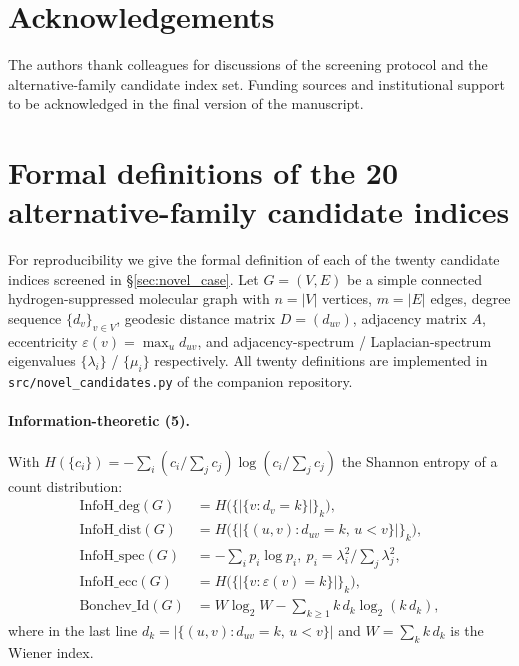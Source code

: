 \documentclass[STIX1COL]{WileyNJDv5}
\theoremstyle{definition}
\begin{document}
\section*{Acknowledgements}

The authors thank colleagues for discussions of the screening
protocol and the alternative-family candidate index set. Funding
sources and institutional support to be acknowledged in the final
version of the manuscript.

\appendix
\section{Formal definitions of the 20 alternative-family candidate indices}\label{app:candidates}

For reproducibility we give the formal definition of each of the
twenty candidate indices screened in \S\ref{sec:novel_case}. Let
$G = (V, E)$ be a simple connected hydrogen-suppressed molecular
graph with $n = |V|$ vertices, $m = |E|$ edges, degree sequence
$\{d_v\}_{v\in V}$, geodesic distance matrix $D = (d_{uv})$,
adjacency matrix $A$, eccentricity $\varepsilon(v) = \max_u d_{uv}$,
and adjacency-spectrum / Laplacian-spectrum eigenvalues
$\{\lambda_i\}$ / $\{\mu_i\}$ respectively. All twenty definitions
are implemented in
\texttt{src/novel\_candidates.py} of the companion repository.

\paragraph{Information-theoretic (5).}
With $H(\{c_i\}) = -\sum_i (c_i / \sum_j c_j)\log(c_i / \sum_j c_j)$
the Shannon entropy of a count distribution:
\begin{align*}
\mathrm{InfoH\_deg}(G) &= H\bigl(\{|\{v : d_v = k\}|\}_k\bigr), \\
\mathrm{InfoH\_dist}(G) &= H\bigl(\{|\{(u,v) : d_{uv} = k,\, u<v\}|\}_k\bigr), \\
\mathrm{InfoH\_spec}(G) &= -\sum_{i} p_i \log p_i,\ p_i = \lambda_i^2 / \textstyle\sum_j \lambda_j^2, \\
\mathrm{InfoH\_ecc}(G) &= H\bigl(\{|\{v : \varepsilon(v) = k\}|\}_k\bigr), \\
\mathrm{Bonchev\_Id}(G) &= W\log_2 W - \sum_{k \ge 1} k\,d_k \log_2(k\,d_k),
\end{align*}
where in the last line $d_k = |\{(u,v) : d_{uv}=k,\,u<v\}|$ and
$W = \sum_k k\,d_k$ is the Wiener index.
\end{document}
